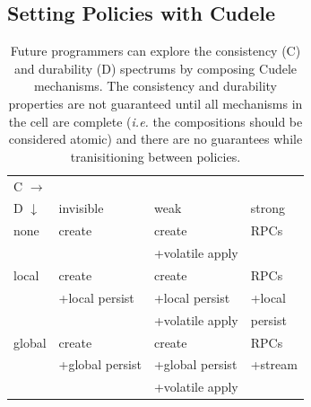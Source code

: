 
\subsection{Setting Policies with Cudele}
\label{sec:setting-policies-with-cudele}

\begin{table}[t]
\begin{center}
\caption{Future programmers can explore the consistency (C) and
durability (D) spectrums by composing Cudele mechanisms. The consistency
and durability properties are not guaranteed until all mechanisms in the cell
are complete ({\it i.e.} the compositions should be considered atomic) and there are
no guarantees while tranisitioning between policies. \label{table:spectrum}}
\begin{tabular}{ l | l | l | l }
  C \(\rightarrow\) &&& \\  
  D \(\downarrow\)  	     & invisible         & weak        & strong  \\\hline
  none                       & create            & create          & RPCs    \\
                             &                   & +volatile apply &         \\\hdashline
  local                      & create            & create          & RPCs    \\
                             & +local persist    & +local persist  & +local  \\
                             &                   & +volatile apply &  persist\\\hdashline
  global                     & create            & create          & RPCs    \\
                             & +global persist   & +global persist & +stream \\
                             &                   & +volatile apply &         \\
\end{tabular}
\end{center}
\end{table}

